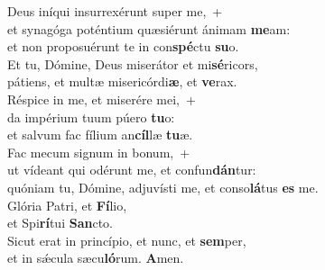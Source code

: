 \oddverse Deus iníqui insurrexérunt super me,~+\\
\oddverse  et synagóga poténtium quæsiérunt ánimam \textbf{me}am:~\*\\
\oddverse et non proposuérunt te in con\textbf{spé}ctu \textbf{su}o.\\
\evenverse Et tu, Dómine, Deus miserátor et mi\textbf{sé}ricors,~\*\\
\evenverse pátiens, et multæ misericórdi\textbf{æ}, et \textbf{ve}rax.\\
\oddverse Réspice in me, et miserére mei,~+\\
\oddverse  da impérium tuum púero \textbf{tu}o:~\*\\
\oddverse et salvum fac fílium an\textbf{cíl}læ \textbf{tu}æ.\\
\evenverse Fac mecum signum in bonum,~+\\
\evenverse  ut vídeant qui odérunt me, et confun\textbf{dán}tur:~\*\\
\evenverse quóniam tu, Dómine, adjuvísti me, et conso\textbf{lá}tus \textbf{es} me.\\
\oddverse Glória Patri, et \textbf{Fí}lio,~\*\\
\oddverse et Spi\textbf{rí}tui \textbf{San}cto.\\
\evenverse Sicut erat in princípio, et nunc, et \textbf{sem}per,~\*\\
\evenverse et in sǽcula sæcu\textbf{ló}rum. \textbf{A}men.\\
